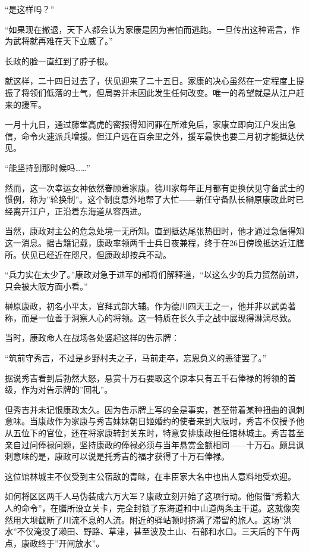 \documentclass[
]{book}
\begin{document}
``是这样吗？''

``如果现在撤退，天下人都会认为家康是因为害怕而逃跑。一旦传出这种谣言，作为武将就再难在天下立威了。''

长政的脸一直红到了脖子根。

就这样，二十四日过去了，伏见迎来了二十五日。家康的决心虽然在一定程度上提振了将领们低落的士气，但局势并未因此发生任何改变。唯一的希望就是从江户赶来的援军。

一月十九日，通过藤堂高虎的密报得知问罪在所难免后，家康立即向江户发出急信，命令火速派兵增援。但江户远在百余里之外，援军最快也要二月初才能抵达伏见。

``能坚持到那时候吗\ldots\ldots{}''

然而，这一次幸运女神依然眷顾着家康。德川家每年正月都有更换伏见守备武士的惯例，称为''轮换制''。这个制度意外地帮了大忙------新任守备队长榊原康政此时已经离开江户，正沿着东海道从容西进。

当然，康政对主公的危急处境一无所知。直到抵达尾张热田时，他才通过急信得知这一消息。据古籍记载，康政率领两千士兵日夜兼程，终于在26日傍晚抵达近江膳所。伏见已经近在咫尺，但康政却按兵不动。

``兵力实在太少了。''康政对急于进军的部将们解释道，``以这么少的兵力贸然前进，只会被大阪方面小看。''

榊原康政，初名小平太，官拜式部大辅。作为德川四天王之一，他并非以武勇著称，而是一位善于洞察人心的将领。这一特质在长久手之战中展现得淋漓尽致。

当时，康政命人在战场各处竖起这样的告示牌：

``筑前守秀吉，不过是乡野村夫之子，马前走卒，忘恩负义的恶徒罢了。''

据说秀吉看到后勃然大怒，悬赏十万石要取这个原本只有五千石俸禄的将领的首级，作为对告示牌的''回礼''。

但秀吉并未记恨康政太久。因为告示牌上写的全是事实，甚至带着某种扭曲的讽刺意味。当康政作为家康与秀吉妹妹朝日姬婚约的使者来到大阪时，秀吉不仅授予他从五位下的官位，还在将家康转封关东时，特意安排康政担任馆林城主。秀吉甚至亲自过问俸禄问题，坚持康政的俸禄必须与当年悬赏金额相同------十万石。颇具讽刺意味的是，康政可以说是托秀吉的福才获得了十万石俸禄。

这位馆林城主不仅受到主公宿敌的青睐，在丰臣家大名中也出人意料地受欢迎。

如何将区区两千人马伪装成六万大军？康政立刻开始了这项行动。他假借''秀赖大人的命令''，在膳所设立关卡，完全封锁了东海道和中山道两条主干道。这就像突然用大坝截断了川流不息的人流。附近的驿站顿时挤满了滞留的旅人。这场''洪水''不仅淹没了濑田、野路、草津，甚至波及土山、石部和水口。三天后的下午两点，康政终于''开闸放水''。
\end{document}
